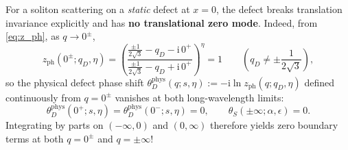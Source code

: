 \documentclass[11pt,a4paper]{article}
\newcommand{\ii}{\mathrm{i}}
\begin{document}
For a soliton scattering on a \emph{static} defect at $x=0$, the defect breaks
translation invariance explicitly and has \textbf{no translational zero mode}.
Indeed, from \eqref{eq:z_ph}, as $q \to 0^\pm$,
\begin{equation}\label{eq:z_ph_zero}
  z_{\mathrm{ph}}(0^\pm;q_D,\eta)
  = \left(\frac{\frac{\pm 1}{2\sqrt{3}} - q_D - \ii\,0^+}{\frac{\pm 1}{2\sqrt{3}} - q_D + \ii\,0^+}\right)^{\eta}
  = 1 \qquad \left(q_D \ne \pm\frac{1}{2\sqrt{3}}\right),
\end{equation}
so the physical defect phase shift $\theta_D^{\mathrm{phys}}(q;s,\eta) := -\ii\ln z_{\mathrm{ph}}(q;q_D,\eta)$
defined continuously from $q=0^\pm$ vanishes at both long-wavelength limits:
\begin{equation}\label{eq:theta_D_zero}
  \theta_D^{\mathrm{phys}}(0^+;s,\eta) = \theta_D^{\mathrm{phys}}(0^-;s,\eta) = 0, \qquad
  \theta_S(\pm\infty;\alpha,\epsilon) = 0.
\end{equation}
Integrating by parts on $(-\infty,0)$ and $(0,\infty)$ therefore yields zero
boundary terms at both $q=0^\pm$ and $q=\pm\infty$!
\end{document}
